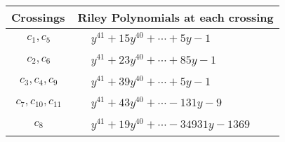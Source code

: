 \documentclass[1p]{elsarticle_modified}
\theoremstyle{definition}
\begin{document}
\begin{tabular}{m{50pt}|m{274pt}}
Crossings & \hspace{64pt}Riley Polynomials at each crossing \\
\hline $$\begin{aligned}c_{1},c_{5}\end{aligned}$$&$\begin{aligned}
&y^{41}+15 y^{40}+\cdots+5 y-1
\end{aligned}$\\
\hline $$\begin{aligned}c_{2},c_{6}\end{aligned}$$&$\begin{aligned}
&y^{41}+23 y^{40}+\cdots+85 y-1
\end{aligned}$\\
\hline $$\begin{aligned}c_{3},c_{4},c_{9}\end{aligned}$$&$\begin{aligned}
&y^{41}+39 y^{40}+\cdots+5 y-1
\end{aligned}$\\
\hline $$\begin{aligned}c_{7},c_{10},c_{11}\end{aligned}$$&$\begin{aligned}
&y^{41}+43 y^{40}+\cdots-131 y-9
\end{aligned}$\\
\hline $$\begin{aligned}c_{8}\end{aligned}$$&$\begin{aligned}
&y^{41}+19 y^{40}+\cdots-34931 y-1369
\end{aligned}$\\
\hline
\end{tabular}
\vskip 2pc
\end{document}
